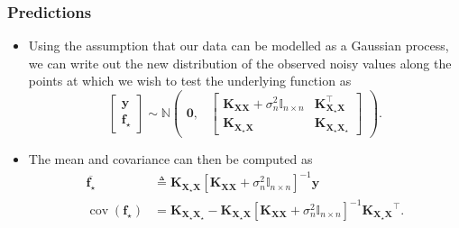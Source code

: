 \documentclass[9pt,hyperref={pdfpagelabels=false},xcolor=table]{beamer}
\begin{document}
\begin{frame}
    \frametitle{Predictions}
    \begin{itemize}
        \item Using the assumption that our data can be modelled as a Gaussian process, we can write out the new distribution of the observed noisy values along the points at which we wish to test the underlying function as
              \[
                  \begin{bmatrix}
                      \bm{y} \\
                      \bm{f}_{\star}
                  \end{bmatrix}
                  \sim \mathbb{N}
                  \begin{pmatrix}
                      \bm{0}, &
                      {
                              \begin{bmatrix}
                                  \bm{K_{XX}} + \sigma_n^2 \mathbb{I}_{n \times n} & \bm{K_{X_{\star}X}^{\intercal}} \\
                                  \bm{K_{X_{\star}X}}                              & \bm{K_{X_{\star}X_{\star}}}
                              \end{bmatrix}
                          }
                  \end{pmatrix}.
              \]
        \item The mean and covariance can then be computed as
              \begin{align*}
                  \overline{\bm{f}_{\star}}           & \triangleq \bm{K_{X_{\star}X}} \left[ \bm{K_{XX}} + \sigma_n^2 \mathbb{I}_{n \times n} \right]^{-1} \bm{y}                                                \\
                  \operatorname{cov} (\bm{f}_{\star}) & = \bm{K_{X_{\star}X_{\star}}} - \bm{K_{X_{\star}X}} \left[ \bm{K_{XX}} + \sigma_n^2 \mathbb{I}_{n \times n} \right]^{-1} \bm{K_{X_{\star}X}}^{\intercal}.
              \end{align*}
    \end{itemize}
\end{frame}
\end{document}
